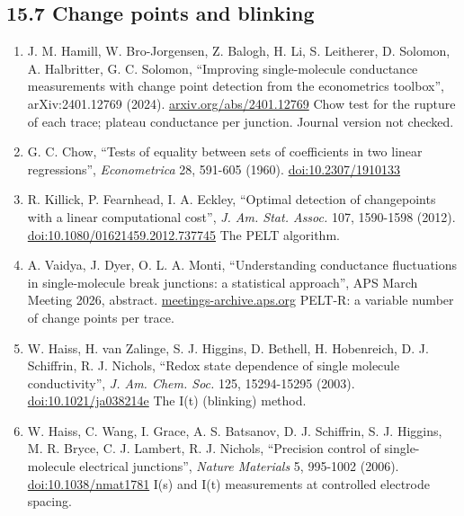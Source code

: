 \documentclass[
  11pt,
  a4paper,
]{article}
\providecommand{\tightlist}{%
  \setlength{\itemsep}{0pt}\setlength{\parskip}{0pt}}
\begin{document}
\hypertarget{change-points-and-blinking}{%
\subsection{15.7 Change points and
blinking}\label{change-points-and-blinking}}

\begin{enumerate}
\def\labelenumi{\arabic{enumi}.}
\setcounter{enumi}{37}
\tightlist
\item
  J. M. Hamill, W. Bro-Jorgensen, Z. Balogh, H. Li, S. Leitherer, D.
  Solomon, A. Halbritter, G. C. Solomon, ``Improving single-molecule
  conductance measurements with change point detection from the
  econometrics toolbox'', arXiv:2401.12769 (2024).
  \href{https://arxiv.org/abs/2401.12769}{arxiv.org/abs/2401.12769} Chow
  test for the rupture of each trace; plateau conductance per junction.
  Journal version not checked.
\item
  G. C. Chow, ``Tests of equality between sets of coefficients in two
  linear regressions'', \emph{Econometrica} 28, 591-605 (1960).
  \href{https://doi.org/10.2307/1910133}{doi:10.2307/1910133}
\item
  R. Killick, P. Fearnhead, I. A. Eckley, ``Optimal detection of
  changepoints with a linear computational cost'', \emph{J. Am. Stat.
  Assoc.} 107, 1590-1598 (2012).
  \href{https://doi.org/10.1080/01621459.2012.737745}{doi:10.1080/01621459.2012.737745}
  The PELT algorithm.
\item
  A. Vaidya, J. Dyer, O. L. A. Monti, ``Understanding conductance
  fluctuations in single-molecule break junctions: a statistical
  approach'', APS March Meeting 2026, abstract.
  \href{https://meetings-archive.aps.org/smt/2026/mar-s71/8/}{meetings-archive.aps.org}
  PELT-R: a variable number of change points per trace.
\item
  W. Haiss, H. van Zalinge, S. J. Higgins, D. Bethell, H. Hobenreich, D.
  J. Schiffrin, R. J. Nichols, ``Redox state dependence of single
  molecule conductivity'', \emph{J. Am. Chem. Soc.} 125, 15294-15295
  (2003).
  \href{https://doi.org/10.1021/ja038214e}{doi:10.1021/ja038214e} The
  I(t) (blinking) method.
\item
  W. Haiss, C. Wang, I. Grace, A. S. Batsanov, D. J. Schiffrin, S. J.
  Higgins, M. R. Bryce, C. J. Lambert, R. J. Nichols, ``Precision
  control of single-molecule electrical junctions'', \emph{Nature
  Materials} 5, 995-1002 (2006).
  \href{https://doi.org/10.1038/nmat1781}{doi:10.1038/nmat1781} I(s) and
  I(t) measurements at controlled electrode spacing.
\end{enumerate}
\end{document}

